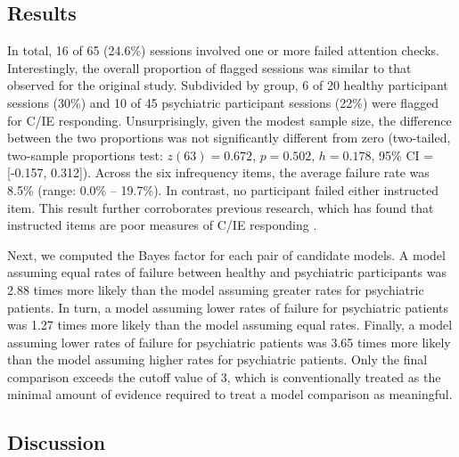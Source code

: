 \documentclass[a4paper,notitlepage,12pt]{article}
\begin{document}
\subsection*{Results}

In total, 16 of 65 (24.6\%) sessions involved one or more failed attention checks. Interestingly, the overall proportion of flagged sessions was similar to that observed for the original study. Subdivided by group, 6 of 20 healthy participant sessions (30\%) and 10 of 45 psychiatric participant sessions (22\%) were flagged for C/IE responding. Unsurprisingly, given the modest sample size, the difference between the two proportions was not significantly different from zero (two-tailed, two-sample proportions test: $z(63)=0.672$, $p=0.502$, $h=0.178$, 95\% CI = [-0.157, 0.312]). Across the six infrequency items, the average failure rate was 8.5\% (range: 0.0\% -- 19.7\%). In contrast, no participant failed either instructed item. This result further corroborates previous research, which has found that instructed items are poor measures of C/IE responding \cite{barends2019noncompliant-2, thomas2017validity-2, hauser2016attentive-2}.   

Next, we computed the Bayes factor for each pair of candidate models. A model assuming equal rates of failure between healthy and psychiatric participants was 2.88 times more likely than the model assuming greater rates for psychiatric patients. In turn, a model assuming lower rates of failure for psychiatric patients was 1.27 times more likely than the model assuming equal rates. Finally, a model assuming lower rates of failure for psychiatric patients was 3.65 times more likely than the model assuming higher rates for psychiatric patients. Only the final comparison exceeds the cutoff value of 3, which is conventionally treated as the minimal amount of evidence required to treat a model comparison as meaningful.  

\subsection*{Discussion}
\end{document}
